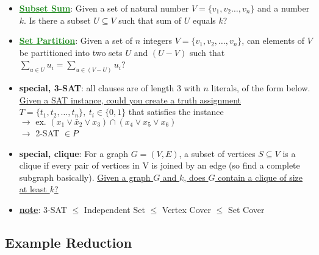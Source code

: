 \begin{itemize}
    \item \textcolor{ForestGreen}{\textbf{\ul{Subset Sum}}}: Given a set of natural number $V = \{v_1, v_2 \ldots, v_n\}$ and a number $k$. Is there a subset $U \subseteq V$ such that sum of $U$ equals $k$?
    \item \textcolor{ForestGreen}{\textbf{\ul{Set Partition}}}: Given a set of $n$ integers $V = \{v_1, v_2, \ldots, v_n\}$, can elements of $V$ be partitioned into two sets $U$ and $(U-V)$ such that $\sum_{u \in U} u_i = \sum_{u \in (V-U)} u_i$?
    
    \item \textcolor{BrickRed}{\textbf{special, 3-SAT}}: all clauses are of length 3 with $n$ literals, of the form below. \ul{Given a SAT instance, could you create a truth assignment $T = \{t_1, t_2, \ldots, t_n\}, ~ t_i \in \{0, 1\}$} that satisfies the instance \\
    $\longrightarrow \text{ ex. } (x_1 \lor \bar x_2 \lor x_3) \cap (x_4 \lor x_5 \lor x_6)$\\
    $\longrightarrow$ 2-SAT $\in P$
    \item \textcolor{BrickRed}{\textbf{special, clique}}: For a graph $G = (V, E)$, a subset of vertices $S \subseteq V$ is a clique if every pair of vertices in V is joined by an edge (so find a complete subgraph basically). \ul{Given a graph $G$ and $k$, does $G$ contain a clique of size at least $k$?}
    \item \textbf{\ul{note}}: 3-SAT $\leq$ Independent Set $\leq$ Vertex Cover $\leq$ Set Cover
\end{itemize}


\subsection*{Example Reduction}
